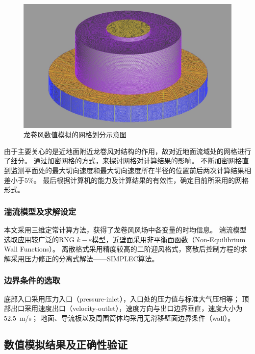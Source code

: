 \documentclass{ctexart}
\begin{document}
\begin{figure}[h!]
\centering
\includegraphics[width=\textwidth]{./fig/mesh}
\caption{龙卷风数值模拟的网格划分示意图}
\label{fig:mesh}
\end{figure}

由于主要关心的是近地面附近龙卷风对结构的作用，故对近地面流域处的网格进行了细分。
通过加密网格的方式，来探讨网格对计算结果的影响。
不断加密网格直到监测平面处的最大切向速度和最大切向速度所在半径的位置前后两次计算结果相差小于$5 \%$。
最后根据计算机的能力及计算结果的有效性，确定目前所采用的网格形式。

\subsubsection{湍流模型及求解设定}
本文采用三维定常计算方法，获得了龙卷风风场中各变量的时均信息。
湍流模型选取应用较广泛的RNG $k-\varepsilon$模型，近壁面采用非平衡面函数（Non-Equilibrium Wall Functions）。
离散格式采用精度较高的二阶迎风格式，离散后控制方程的求解采用压力修正的分离式解法——SIMPLEC算法。

\subsubsection{边界条件的选取}
底部入口采用压力入口（pressure-inlet），入口处的压力值与标准大气压相等；
顶部出口采用速度出口（velocity-outlet），速度方向与出口边界垂直，速度大小为\SI{52.5}{m/s}；
地面、导流板以及周围筒体均采用无滑移壁面边界条件（wall）。


\subsection{数值模拟结果及正确性验证}\label{sec:cfd_verification}
\end{document}
